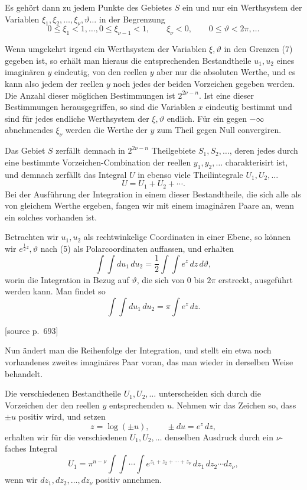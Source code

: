 \documentclass[11pt]{article}
\newcommand{\srcpage}[1]{\par\medskip\noindent\textsf{[source p.~#1]}\par\smallskip}
\begin{document}
Es gehört dann zu jedem Punkte des Gebietes $S$ ein und nur ein Werthsystem der Variablen $\xi_1,\xi_2,\ldots,\xi_\nu,\vartheta\ldots$ in der Begrenzung
\begin{equation}
0\leq\xi_1<1,\ldots,
0\leq\xi_{\nu-1}<1,
\qquad
\xi_\nu<0,
\qquad
0\leq\vartheta<2\pi,\ldots
\tag{7}
\end{equation}

Wenn umgekehrt irgend ein Werthsystem der Variablen $\xi,\vartheta$ in den Grenzen (7) gegeben ist, so erhält man hieraus die entsprechenden Bestandtheile $u_1,u_2$ eines imaginären $y$ eindeutig, von den reellen $y$ aber nur die absoluten Werthe, und es kann also jedem der reellen $y$ noch jedes der beiden Vorzeichen gegeben werden. Die Anzahl dieser möglichen Bestimmungen ist $2^{2\nu-n}$. Ist eine dieser Bestimmungen herausgegriffen, so sind die Variablen $x$ eindeutig bestimmt und sind für jedes endliche Werthsystem der $\xi,\vartheta$ endlich. Für ein gegen $-\infty$ abnehmendes $\xi_\nu$ werden die Werthe der $y$ zum Theil gegen Null convergiren.

Das Gebiet $S$ zerfällt demnach in $2^{2\nu-n}$ Theilgebiete $S_1,S_2,\ldots$, deren jedes durch eine bestimmte Vorzeichen-Combination der reellen $y_1,y_2,\ldots$ charakterisirt ist, und demnach zerfällt das Integral $U$ in ebenso viele Theilintegrale $U_1,U_2,\ldots$
\[
U=U_1+U_2+\cdots.
\]
Bei der Ausführung der Integration in einem dieser Bestandtheile, die sich alle als von gleichem Werthe ergeben, fangen wir mit einem imaginären Paare an, wenn ein solches vorhanden ist.

Betrachten wir $u_1,u_2$ als rechtwinkelige Coordinaten in einer Ebene, so können wir $e^{\frac12 z},\vartheta$ nach (5) als Polarcoordinaten auffassen, und erhalten
\[
\int\!\int du_1\,du_2=\frac12\int\!\int e^z\,dz\,d\vartheta,
\]
worin die Integration in Bezug auf $\vartheta$, die sich von 0 bis $2\pi$ erstreckt, ausgeführt werden kann. Man findet so
\[
\int\!\int du_1\,du_2=\pi\int e^z\,dz.
\]

\srcpage{693}
Nun ändert man die Reihenfolge der Integration, und stellt ein etwa noch vorhandenes zweites imaginäres Paar voran, das man wieder in derselben Weise behandelt.

Die verschiedenen Bestandtheile $U_1,U_2,\ldots$ unterscheiden sich durch die Vorzeichen der den reellen $y$ entsprechenden $u$. Nehmen wir das Zeichen so, dass $\pm u$ positiv wird, und setzen
\begin{equation}
z=\log(\pm u),
\qquad \pm du=e^z\,dz,
\tag{8}
\end{equation}
erhalten wir für die verschiedenen $U_1,U_2,\ldots$ denselben Ausdruck durch ein $\nu$-faches Integral
\begin{equation}
U_1=\pi^{n-\nu}\int\!\int\cdots\int e^{z_1+z_2+\cdots+z_\nu}\,dz_1\,dz_2\cdots dz_\nu,
\tag{9}
\end{equation}
wenn wir $dz_1,dz_2,\ldots,dz_\nu$ positiv annehmen.
\end{document}
